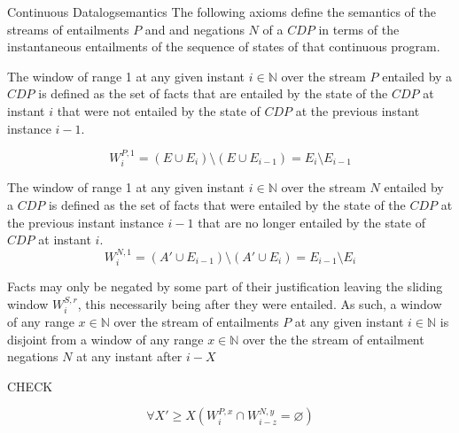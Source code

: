 \begin{nestedsection}{Continuous Datalog}{semantics}
The following axioms define the semantics of the streams of
entailments $P$ and and negations $N$ of a ${CDP}$ in terms of the
instantaneous entailments of the sequence of states of that continuous
program.

\begin{axiom}
\label{axiom:continuous datalog: positive window increment}

The window of range 1 at any given instant ${i \in \mathbb{N}}$ over
the stream $P$ entailed by a ${CDP}$ is defined as the set of facts
that are entailed by the state of the ${CDP}$ at instant $i$ that were
not entailed by the state of ${CDP}$ at the previous instant instance
${i-1}$.

\begin{equation*}
W^{P,1}_{i} = \left( E \cup E_{i} \right) \setminus \left( E \cup E_{i-1} \right) = E_{i} \setminus E_{i-1}
\end{equation*}
\end{axiom}

\begin{axiom}
\label{axiom:continuous datalog: negative window increment}
The window of range 1 at any given instant ${i \in \mathbb{N}}$ over
the stream $N$ entailed by a ${CDP}$ is defined as the set of facts
that were entailed by the state of the ${CDP}$ at the previous instant
instance ${i-1}$ that are no longer entailed by the state of ${CDP}$
at instant $i$.
\begin{equation*}
W^{N,1}_{i} = \left( A' \cup E_{i-1} \right) \setminus \left( A' \cup E_{i} \right) = E_{i-1} \setminus E_{i}
\end{equation*}
\end{axiom}

\begin{axiom}
\label{axiom:continuous datalog: entailment precedes negation}
Facts may only be negated by some part of their justification leaving
the sliding window $W^{S,r}_{i}$, this necessarily being after they
were entailed.  As such, a window of any range ${x \in \mathbb{N}}$
over the stream of entailments $P$ at any given instant ${i \in
  \mathbb{N}}$ is disjoint from a window of any range ${x \in
  \mathbb{N}}$ over the the stream of entailment negations $N$ at any
instant after ${i - X}$

CHECK

\begin{equation*}
\forall X' \geq X \left( W^{P,x}_{i} \cap W^{N,y}_{i-z} = \varnothing \right)
\end{equation*}


\end{axiom}
\end{nestedsection}
